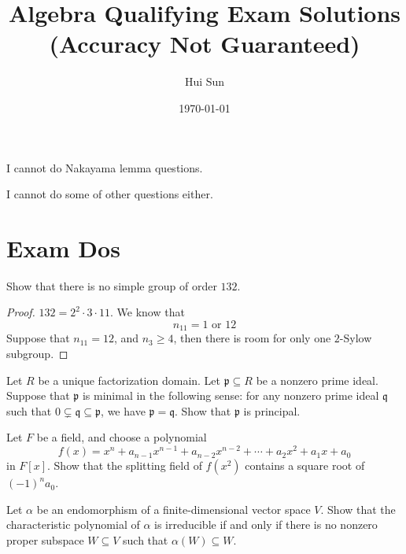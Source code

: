 \documentclass[openany]{book}
\title{Algebra Qualifying Exam Solutions
\\ 
\vspace{0.4cm}
\large (Accuracy Not Guaranteed)}
\date{\today}
\author{Hui Sun}
\begin{document}
\maketitle

\tableofcontents
\newpage


\begin{warn}
    I cannot do Nakayama lemma questions.
\end{warn}

\begin{warn}
    I cannot do some of other questions either.
\end{warn}





\chapter{Exam Dos}
\begin{prob}
    Show that there is no simple group of order $132$.
\end{prob}
\begin{proof}
    $132=2^2\cdot 3\cdot 11$. We know that 
    \begin{equation*}
        n_{11}=1\text{ or } 12
    \end{equation*}
    Suppose that $n_{11}=12$, and $n_3\geq 4$, then there is room for only one $2$-Sylow subgroup.
\end{proof}



\begin{prob}
    Let $R$ be a unique factorization domain. Let $\mathfrak p\subseteq R$ be a nonzero prime ideal. Suppose that $\mathfrak p$ is minimal in the following sense: for any nonzero prime ideal $\mathfrak q$ such that $0\subsetneq\mathfrak q\subseteq\mathfrak p$, we have $\mathfrak p=\mathfrak q$. Show that $\mathfrak p$ is principal.
\end{prob}



\begin{prob}
    Let $F$ be a field, and choose a polynomial
    \[f(x)=x^n+a_{n-1}x^{n-1}+a_{n-2}x^{n-2}+\cdots+a_2x^2+a_1x+a_0\]
    in $F[x]$. Show that the splitting field of $f\left(x^2\right)$ contains a square root of $(-1)^na_0$.
\end{prob}


\begin{prob}
    Let $\alpha$ be an endomorphism of a finite-dimensional vector space $V$. Show that the characteristic polynomial of $\alpha$ is irreducible if and only if there is no nonzero proper subspace $W\subseteq V$ such that $\alpha(W)\subseteq W$.
\end{prob}
\end{document}
